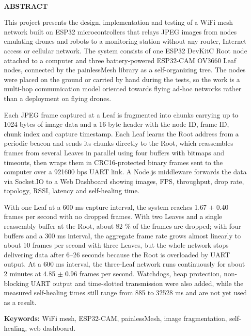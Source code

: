 \clearpage
\begin{center}
{\fontsize{16}{20}\selectfont\bfseries \tendetaitienganh\\[0.4cm] ABSTRACT\par}
\end{center}
\vspace{0.3cm}
This project presents the design, implementation and testing of a WiFi mesh network built on ESP32 microcontrollers that relays JPEG images from nodes emulating drones and robots to a monitoring station without any router, Internet access or cellular network. The system consists of one ESP32 DevKitC Root node attached to a computer and three battery-powered ESP32-CAM OV3660 Leaf nodes, connected by the painlessMesh library as a self-organizing tree. The nodes were placed on the ground or carried by hand during the tests, so the work is a multi-hop communication model oriented towards flying ad-hoc networks rather than a deployment on flying drones.

Each JPEG frame captured at a Leaf is fragmented into chunks carrying up to 1024 bytes of image data and a 16-byte header with the node ID, frame ID, chunk index and capture timestamp. Each Leaf learns the Root address from a periodic beacon and sends its chunks directly to the Root, which reassembles frames from several Leaves in parallel using four buffers with bitmaps and timeouts, then wraps them in CRC16-protected binary frames sent to the computer over a 921600 bps UART link. A Node.js middleware forwards the data via Socket.IO to a Web Dashboard showing images, FPS, throughput, drop rate, topology, RSSI, latency and self-healing time.

With one Leaf at a 600 ms capture interval, the system reaches 1.67 $\pm$ 0.40 frames per second with no dropped frames. With two Leaves and a single reassembly buffer at the Root, about 82 \% of the frames are dropped; with four buffers and a 300 ms interval, the aggregate frame rate grows almost linearly to about 10 frames per second with three Leaves, but the whole network stops delivering data after 6–26 seconds because the Root is overloaded by UART output. At a 600 ms interval, the three-Leaf network runs continuously for about 2 minutes at 4.85 $\pm$ 0.96 frames per second. Watchdogs, heap protection, non-blocking UART output and time-slotted transmission were also added, while the measured self-healing times still range from 885 to 32528 ms and are not yet used as a result.

\noindent\textbf{Keywords:} WiFi mesh, ESP32-CAM, painlessMesh, image fragmentation, self-healing, web dashboard.

